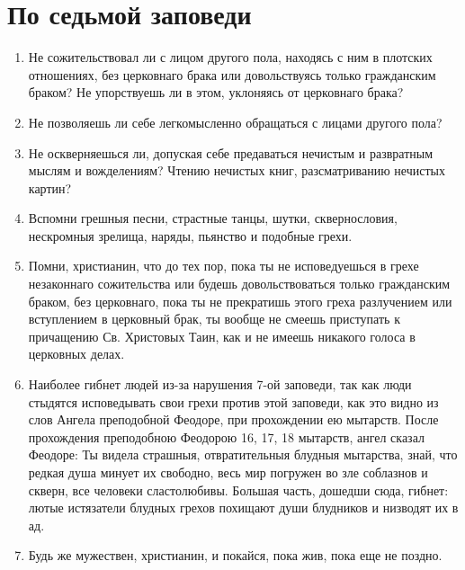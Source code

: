 \section{По седьмой заповеди}\nopagebreak

\begin{mymulticols}

\begin{enumerate}

\item Не сожительствовал ли с лицом другого пола, находясь с ним в плотских отношениях, без церковнаго брака или довольствуясь только гражданским браком? Не упорствуешь ли в этом, уклоняясь от церковнаго брака?

\item Не позволяешь ли себе легкомысленно обращаться с лицами другого пола?

\item Не оскверняешься ли, допуская себе предаваться нечистым и развратным мыслям и вожделениям? Чтению нечистых книг, разсматриванию нечистых картин?

\item Вспомни грешныя песни, страстные танцы, шутки, сквернословия, нескромныя зрелища, наряды, пьянство и подобные грехи.

\item Помни, христианин, что до тех пор, пока ты не исповедуешься в грехе незаконнаго сожительства или будешь довольствоваться только гражданским браком, без церковнаго, пока ты не прекратишь этого греха разлучением или вступлением в церковный брак, ты вообще не смеешь приступать к причащению Св. Христовых Таин, как и не имеешь никакого голоса в церковных делах.

\item Наиболее гибнет людей из-за нарушения 7-ой заповеди, так как люди стыдятся исповедывать свои грехи против этой заповеди, как это видно из слов Ангела преподобной Феодоре, при прохождении ею мытарств. После прохождения преподобною Феодорою 16, 17, 18 мытарств, ангел сказал Феодоре: Ты видела страшныя, отвратительныя блудныя мытарства, знай, что редкая душа минует их свободно, весь мир погружен во зле соблазнов и скверн, все человеки сластолюбивы. Большая часть, дошедши сюда, гибнет: лютые истязатели блудных грехов похищают души блудников и низводят их в ад.

\item Будь же мужествен, христианин, и покайся, пока жив, пока еще не поздно. 
\end{enumerate}

\end{mymulticols}

